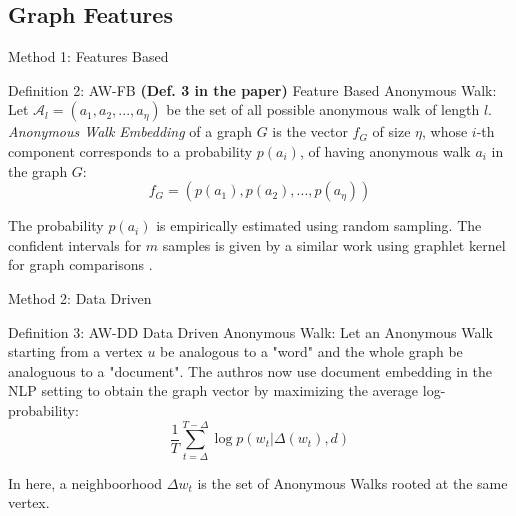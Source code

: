 \documentclass{beamer}
\begin{document}
    \subsection{Graph Features}

    \begin{frame}{Method 1: Features Based}
       \begin{block}{Definition 2: AW-FB}
            \textbf{(Def. 3 in the paper)} Feature Based Anonymous Walk:
            Let $\mathcal{A}_l = (a_1, a_2, ..., a_\eta)$ be the set of all
            possible anonymous walk of length $l$. \emph{Anonymous Walk 
            Embedding} of a graph $G$ is the vector $f_G$ of size $\eta$, 
            whose $i$-th component corresponds to a probability $p(a_i)$, 
            of having anonymous walk $a_i$ in the graph $G$:
            $$ f_G = (p(a_1), p(a_2), ..., p(a_\eta)) $$
       \end{block} 

       The probability $p(a_i)$ is empirically estimated using random sampling. 
       The confident intervals for $m$ samples is given by a similar work using
       graphlet kernel for graph comparisons \cite{shervashidze2009efficient}.
    \end{frame}

    \begin{frame}{Method 2: Data Driven}
       \begin{block}{Definition 3: AW-DD}
            Data Driven Anonymous Walk: Let an Anonymous Walk starting from 
            a vertex $u$ be analogous to a "word" and the whole graph be 
            analoguous to a "document". The authros now use document embedding 
            in the NLP setting to obtain the graph vector by maximizing the
            average log-probability:
            $$ \frac{1}{T} \sum_{t=\Delta}^{T-\Delta} \log p(w_t | \Delta(w_t), d) $$
       \end{block} 

       \vspace{1em}

       In here, a neighboorhood $\Delta{w_t}$ is the set of Anonymous Walks
       rooted at the same vertex.
    \end{frame}
\end{document}
